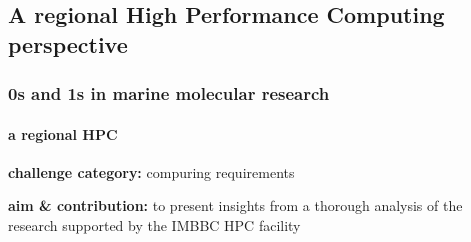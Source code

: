 \documentclass{beamer}
\begin{document}
   \begin{darkframes}
      \section{
         A regional High Performance Computing perspective
         }

      \begin{frame}
         \frametitle{0s and 1s in marine molecular research}
         \framesubtitle{a regional HPC}
 

         \textbf{challenge category:} compuring requirements

         \bigskip

         \textbf{aim \& contribution:}
         to present insights from a thorough analysis of the research supported by
         the IMBBC HPC facility 


      \end{frame}
   \end{darkframes}
\end{document}
